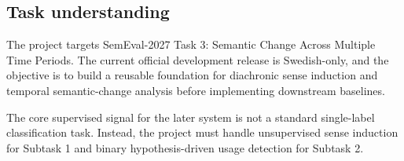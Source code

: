 \subsection{Task understanding}
The project targets SemEval-2027 Task 3: Semantic Change Across Multiple Time Periods. The current official development release is Swedish-only, and the objective is to build a reusable foundation for diachronic sense induction and temporal semantic-change analysis before implementing downstream baselines.

The core supervised signal for the later system is not a standard single-label classification task. Instead, the project must handle unsupervised sense induction for Subtask 1 and binary hypothesis-driven usage detection for Subtask 2.
